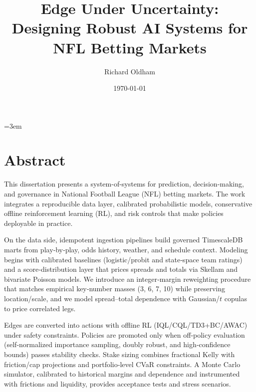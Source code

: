 \documentclass[12pt]{report}  %
\numberwithin{equation}{section}
\theoremstyle{plain}
\theoremstyle{definition}
\theoremstyle{remark}
\providecommand{\frontmatter}{\pagenumbering{roman}}
\begin{document}
\singlespacing  %
\emergencystretch=3em %

\frontmatter

\title{Edge Under Uncertainty: Designing Robust AI Systems for NFL Betting Markets}            %
\author{Richard Oldham}                    %
\date{\today}                           %
\hypersetup{pageanchor=false}
\maketitle

\chapter*{Abstract}
This dissertation presents a system-of-systems for prediction, decision‑making, and governance in National Football League (NFL) betting markets. The work integrates a reproducible data layer, calibrated probabilistic models, conservative offline reinforcement learning (RL), and risk controls that make policies deployable in practice.

On the data side, idempotent ingestion pipelines build governed TimescaleDB marts from play‑by‑play, odds history, weather, and schedule context. Modeling begins with calibrated baselines (logistic/probit and state‑space team ratings) and a score‑distribution layer that prices spreads and totals via Skellam and bivariate Poisson models. We introduce an integer‑margin reweighting procedure that matches empirical key‑number masses (3, 6, 7, 10) while preserving location/scale, and we model spread–total dependence with Gaussian/$t$ copulas to price correlated legs.

Edges are converted into actions with offline RL (IQL/CQL/TD3+BC/AWAC) under safety constraints. Policies are promoted only when off‑policy evaluation (self‑normalized importance sampling, doubly robust, and high‑confidence bounds) passes stability checks. Stake sizing combines fractional Kelly with friction/cap projections and portfolio‑level CVaR constraints. A Monte Carlo simulator, calibrated to historical margins and dependence and instrumented with frictions and liquidity, provides acceptance tests and stress scenarios.
\end{document}
